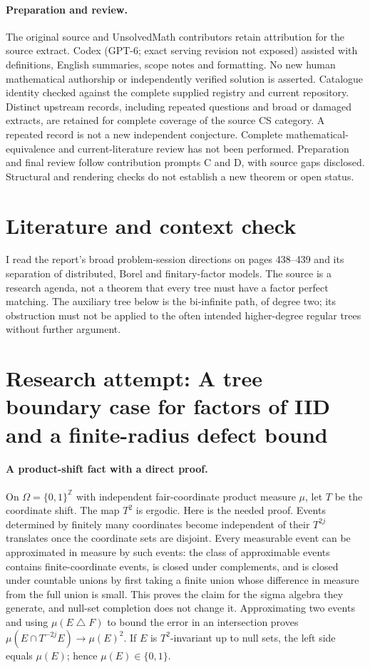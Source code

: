 \documentclass[11pt]{article}
\begin{document}
\paragraph{Preparation and review.}
The original source and UnsolvedMath contributors retain attribution for the source extract. Codex (GPT-6; exact serving revision not exposed) assisted with definitions, English summaries, scope notes and formatting. No new human mathematical authorship or independently verified solution is asserted. Catalogue identity checked against the complete supplied registry and current repository. Distinct upstream records, including repeated questions and broad or damaged extracts, are retained for complete coverage of the source CS category. A repeated record is not a new independent conjecture. Complete mathematical-equivalence and current-literature review has not been performed. Preparation and final review follow contribution prompts C and D, with source gaps disclosed. Structural and rendering checks do not establish a new theorem or open status.
\label{end:statement}

\section{Literature and context check}

I read the report's broad problem-session directions on pages 438--439 and its
separation of distributed, Borel and finitary-factor models. The source is a
research agenda, not a theorem that every tree must have a factor perfect
matching. The auxiliary tree below is the bi-infinite path, of degree two;
its obstruction must not be applied to the often intended higher-degree
regular trees without further argument.

\section{Research attempt: A tree boundary case for factors of IID and a finite-radius defect bound}

\paragraph{A product-shift fact with a direct proof.}
On $\Omega=\{0,1\}^{\mathbb Z}$ with independent fair-coordinate product
measure $\mu$, let $T$ be the coordinate shift. The map $T^2$ is ergodic.
Here is the needed proof. Events determined by finitely many coordinates become
independent of their $T^{2j}$ translates once the coordinate sets are disjoint.
Every measurable event can be approximated in measure by such events: the
class of approximable events contains finite-coordinate events, is closed under
complements, and is closed under countable unions by first taking a finite union
whose difference in measure from the full union is small. This proves the
claim for the sigma algebra they generate, and null-set completion does not
change it. Approximating two events and using
$\mu(E\mathbin\triangle F)$ to bound the error in an intersection proves
$\mu(E\cap T^{-2j}E)\to\mu(E)^2$.
If $E$ is $T^2$-invariant up to null sets, the left side equals $\mu(E)$;
hence $\mu(E)\in\{0,1\}$.
\end{document}
